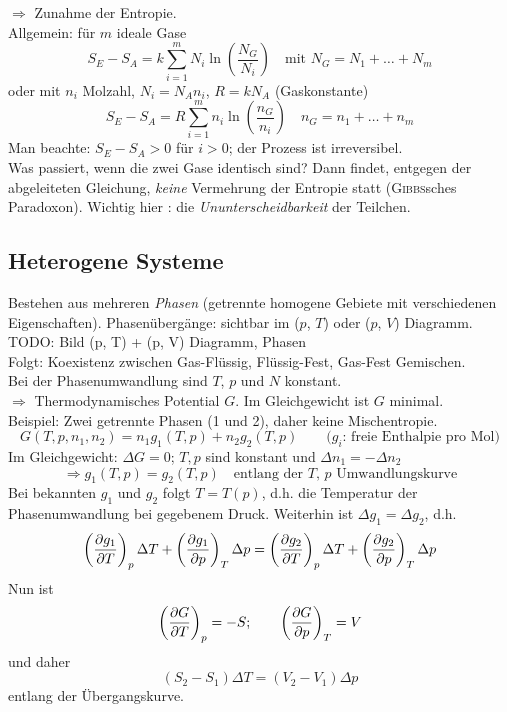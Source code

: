$\Rightarrow$ Zunahme der Entropie. \\[\baselineskip]
Allgemein: für $m$ ideale Gase
\begin{equation}
    S_E - S_A = k \sum_{i=1}^{m} N_i \ln \left( \frac{N_G}{N_i} \right) \quad \text{mit } N_G = N_1 + \ldots + N_m
\end{equation}
oder mit $n_i$ Molzahl, $N_i = N_A n_i$, $R = k N_A$ (Gaskonstante)
\begin{equation}
    S_E - S_A = R \sum_{i=1}^{m} n_i \ln \left( \frac{n_G}{n_i} \right) \quad n_G = n_1 + \ldots + n_m
\end{equation}
Man beachte: $S_E - S_A > 0$ für $i > 0$; der Prozess ist irreversibel. \\
Was passiert, wenn die zwei Gase identisch sind? Dann findet, entgegen der abgeleiteten Gleichung, \emph{keine} Vermehrung der Entropie statt
(\textsc{Gibbs}sches Paradoxon). Wichtig hier : die \emph{Ununterscheidbarkeit} der Teilchen.

\subsection{Heterogene Systeme}
Bestehen aus mehreren \emph{Phasen} (getrennte homogene Gebiete mit verschiedenen Eigenschaften). Phasenübergänge: sichtbar im ($p$, $T$) oder
($p$, $V$) Diagramm. \\
TODO: Bild (p, T) + (p, V) Diagramm, Phasen\\  %
Folgt: Koexistenz zwischen Gas-Flüssig, Flüssig-Fest, Gas-Fest Gemischen.\\
Bei der Phasenumwandlung sind $T$, $p$ und $N$ konstant. \\
$\Rightarrow$ Thermodynamisches Potential $G$. Im Gleichgewicht ist $G$ minimal. \\[\baselineskip]
Beispiel: Zwei getrennte Phasen (1 und 2), daher keine Mischentropie.
\begin{equation}
    G(T, p, n_1, n_2) = n_1 g_1(T, p) + n_2 g_2(T, p) \qquad \text{($g_i$: freie Enthalpie pro Mol)}
\end{equation}
Im Gleichgewicht: $\Delta G = 0$; $T, p$ sind konstant und $\Delta n_1 = - \Delta n_2$
\begin{equation}
    \Rightarrow g_1(T, p) = g_2(T, p) \quad \text{entlang der $T$, $p$ Umwandlungskurve}
\end{equation}
Bei bekannten $g_1$ und $g_2$ folgt $T = T(p)$, d.h. die Temperatur der Phasenumwandlung bei gegebenem Druck.
Weiterhin ist $\Delta g_1 = \Delta g_2$, d.h.
\begin{equation}
    \left( \frac{\partial g_1}{\partial T} \right)_{p} \Delta T + \left( \frac{\partial g_1}{\partial p} \right)_{T} \Delta p = \left( \frac{\partial g_2}{\partial T} \right)_{p} \Delta T + \left( \frac{\partial g_2}{\partial p} \right)_{T} \Delta p
\end{equation}
Nun ist
\begin{equation}
    \left( \frac{\partial G}{\partial T} \right)_{p} = - S; \qquad \left( \frac{\partial G}{\partial p} \right)_{T} = V
\end{equation}
und daher
\begin{equation}
    (S_2 - S_1) \Delta T = (V_2 - V_1) \Delta p
\end{equation}
entlang der Übergangskurve.

